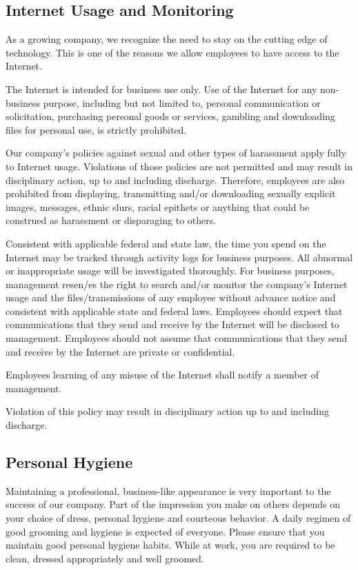 \subsection{Internet Usage and Monitoring}

As a growing company, we recognize the need to stay on the cutting edge of technology. This is one of the reasons we allow employees to have access to the Internet.

The Internet is intended for business use only. Use of the Internet for any non-business purpose, including but not limited to, personal communication or solicitation, purchasing personal goods or services, gambling and downloading files for personal use, is strictly prohibited.

Our company's policies against sexual and other types of harassment apply fully to Internet usage. Violations of those policies are not permitted and may result in disciplinary action, up to and including discharge. Therefore, employees are also prohibited from displaying, transmitting and/or downloading sexually explicit images, messages, ethnic slurs, racial epithets or anything that could be construed as harassment or disparaging to others.

Consistent with applicable federal and state law, the time you spend on the Internet may be tracked through activity logs for business purposes. All abnormal or inappropriate usage will be investigated thoroughly. For business purposes, management resen/es the right to search and/or monitor the company's Internet usage and the files/transmissions of any employee without advance notice and consistent with applicable state and federal laws. Employees should expect that communications that they send and receive by the Internet will be disclosed to management. Employees should not  assume that communications that they send and receive by the Internet are private or confidential.

Employees learning of any misuse of the Internet shall notify a member of management.

Violation of this policy may result in disciplinary action up to and including discharge.

\subsection{Personal Hygiene}

Maintaining a professional, business-like appearance is very important to the success of our company. Part of the impression you make on others depends on your choice of dress, personal hygiene and courteous behavior. A daily regimen of good grooming and hygiene is expected of everyone. Please ensure that you maintain good personal hygiene habits. While at work, you are required to be clean, dressed appropriately and well groomed.

